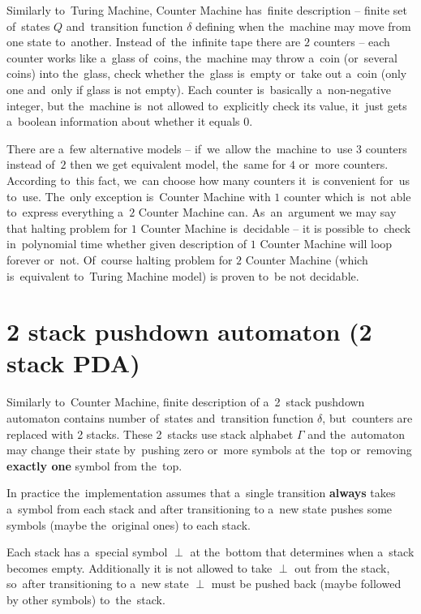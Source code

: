 \documentclass[english,shortabstract,mgr]{iithesis}
\begin{document}
Similarly to~Turing Machine, Counter Machine has~finite description -- finite set of~states $Q$
and~transition function $\delta$ defining when the~machine may move from one state to~another.
Instead of~the~infinite tape there are $2$ counters -- each counter works like a~glass of~coins,
the~machine may throw a~coin (or~several coins) into the~glass, check whether the~glass is~empty
or~take out a~coin (only one and~only if glass is not empty). Each counter is~basically a~non-negative
integer, but the~machine is~not allowed to~explicitly check its value, it~just gets a~boolean
information about whether it equals $0$.

There are a~few alternative models -- if~we~allow the~machine to~use $3$ counters instead of~$2$
then we get equivalent model, the~same for $4$ or~more counters. According to~this fact, we~can
choose how many counters it~is convenient for~us to~use. The~only exception is~Counter Machine with
$1$ counter which is~not able to~express everything a~$2$ Counter Machine can. As~an~argument
we may say that halting problem for $1$ Counter Machine is~decidable -- it is possible to~check
in~polynomial time whether given description of $1$ Counter Machine will loop forever or~not.
Of~course halting problem for $2$ Counter Machine (which is~equivalent to~Turing Machine model)
is proven to~be not decidable. \cite{minsky_67}

\section {2 stack pushdown automaton (2 stack PDA)}

Similarly to~Counter Machine, finite description of a~2~stack pushdown automaton \cite{sipser2012PDA}
contains number of~states and~transition function $\delta$, but~counters are replaced with 2 stacks.
These 2~stacks use stack alphabet $\Gamma$ and the~automaton may change their state
by~pushing zero or~more symbols at the~top or~removing \textbf{exactly one} symbol from
the~top.

In practice the~implementation assumes that a~single transition \textbf{always} takes
a~symbol from each stack and after transitioning to a~new state pushes some symbols
(maybe the~original ones) to each stack.

Each stack has a~special symbol $\perp$ at the~bottom that determines when a~stack becomes
empty. Additionally it is not allowed to take $\perp$ out from the stack, so~after transitioning
to a~new state $\perp$ must be pushed back (maybe followed by other symbols) to~the~stack.
\end{document}
